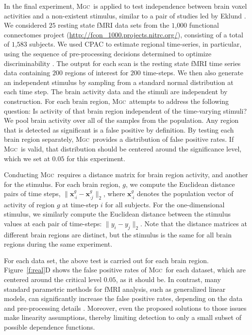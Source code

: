 \documentclass[11pt]{article}
\providecommand{\sct}[1]{{\normalfont\textsc{#1}}}
\providecommand{\mb}[1]{\boldsymbol{#1}}
\newcommand{\Mgc}{\sct{Mgc}}
\begin{document}
In the final experiment, \Mgc~is applied to test independence between brain voxel activities and a non-existent stimulus, similar to a pair of studies led by Eklund  \cite{EklundKnutsson2012,Eklund2015}. We considered $25$ resting state fMRI data sets from the $1$,$000$ functional connectomes project (\url{http://fcon_1000.projects.nitrc.org/}), consisting of a total of $1$,$583$ subjects.
We used CPAC to estimate regional time-series, in particular, using the sequence of pre-processing decisions determined to optimize discriminability \cite{Wang2016}.  The output for each scan is the resting state fMRI time series data containing $200$ regions of interest for $200$ time-steps.
We then also generate an independent stimulus  by sampling from a standard normal distribution at each time step. The brain activity data and the stimuli are independent by construction.
For each brain region, \Mgc~attempts to address the following question: Is activity of that  brain region independent of the time-varying stimuli? We pool brain activity over all of the samples from the population.
Any region that is detected as significant is a false positive by definition.  By testing each brain region separately, \Mgc~provides a distribution of false positive rates.  If \Mgc~is valid, that distribution should be centered around the significance level, which we set at $0.05$ for this experiment.

Conducting \Mgc~requires a distance matrix for brain region activity, and another for the stimulus. For each brain region, $g$, we compute the Euclidean distance pairs of time steps,  $\|\mb{x}_{\cdot i}^g-\mb{x}_{\cdot j}^g\|_2$,  where $\mb{x}_{\cdot i}^g$ denotes the population vector of activity of region $g$ at time-step $i$ for all subjects.
For the one-dimensional stimulus, we similarly compute the Euclidean distance between the stimulus values at each pair of time-steps: $\|y_i - y_j\|_2$.
Note that the distance matrices at different brain regions are distinct, but the stimulus is the same for all brain regions during the same experiment.


For each data set, the above test is carried out for each brain region. 
Figure~\ref{f:real}{\color{magenta}D} shows the false positive rates of  \Mgc~for each dataset, which are centered around the critical level $0.05$, as it should be.
In contrast, many standard parametric methods for fMRI analysis, such as generalized linear models, can significantly increase the false positive rates, depending on the data and pre-processing details \cite{EklundKnutsson2012,Eklund2015}. Moreover, even the proposed solutions to those issues make linearity assumptions, thereby limiting detection to only a small subset of possible dependence functions.
\end{document}
